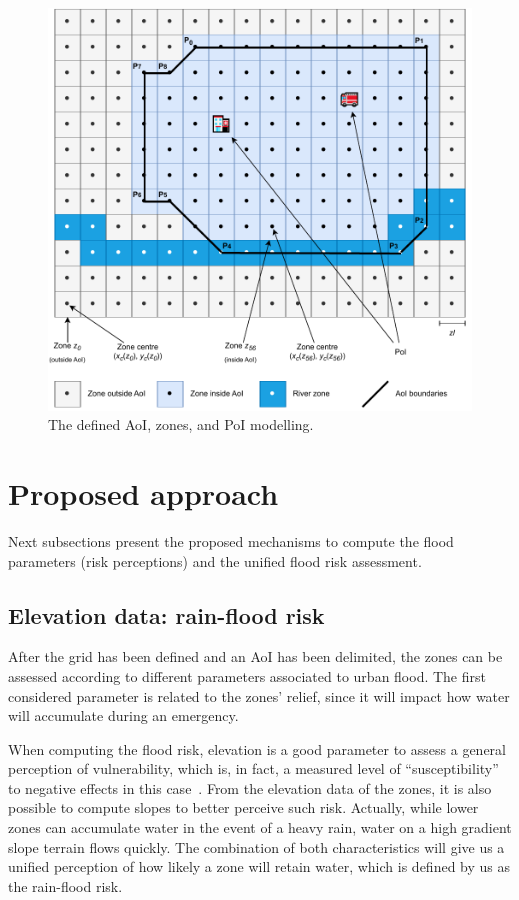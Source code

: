 \begin{refsection}
\begin{figure}[h]
    \centering
    \includegraphics[width=0.85\linewidth]{Chapters/6-Flood/figs/zones_and_pois.pdf}
    \caption{The defined AoI, zones, and PoI modelling.}
    \label{fig:zones_and_pois}
\end{figure}

\section{Proposed approach}
\label{sec:proposal}

Next subsections present the proposed mechanisms to compute the flood parameters (risk perceptions) and the unified flood risk assessment.

\subsection{Elevation data: rain-flood risk}

After the grid has been defined and an AoI has been delimited, the zones can be assessed according to different parameters associated to urban flood. The first considered parameter is related to the zones' relief, since it will impact how water will accumulate during an emergency. 

When computing the flood risk, elevation is a good parameter to assess a general perception of vulnerability, which is, in fact, a measured level of ``susceptibility'' to negative effects in this case~\cite{elevation1,elevation2,elevation3}. From the elevation data of the zones, it is also possible to compute slopes to better perceive such risk. Actually, while lower zones can accumulate water in the event of a heavy rain, water on a high gradient slope terrain flows quickly. The combination of both characteristics will give us a unified perception of how likely a zone will retain water, which is defined by us as the rain-flood risk. 


\end{refsection}
